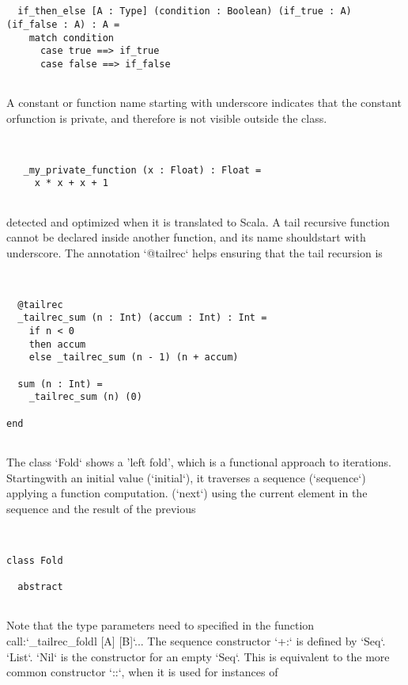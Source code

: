 \documentclass[12pt,a4paper]{article}
\begin{document}
\begin{lstlisting}


  if_then_else [A : Type] (condition : Boolean) (if_true : A) (if_false : A) : A =
    match condition
      case true ==> if_true
      case false ==> if_false


\end{lstlisting}

A constant or function name starting with underscore indicates that the constant orfunction is private, and therefore is not visible outside the class. 


\begin{lstlisting}


   _my_private_function (x : Float) : Float =
     x * x + x + 1


\end{lstlisting}

detected and optimized when it is translated to Scala. A tail recursive function cannot be declared inside another function, and its name shouldstart with underscore. The annotation `@tailrec` helps ensuring that the tail recursion is


\begin{lstlisting}


  @tailrec
  _tailrec_sum (n : Int) (accum : Int) : Int =
    if n < 0
    then accum
    else _tailrec_sum (n - 1) (n + accum)

  sum (n : Int) =
    _tailrec_sum (n) (0)

end


\end{lstlisting}

The class `Fold` shows a 'left fold', which is a functional approach to iterations. Startingwith an initial value (`initial`), it traverses a sequence (`sequence`) applying a function
computation. (`next`) using the current element in the sequence and the result of the previous


\begin{lstlisting}


class Fold

  abstract


\end{lstlisting}

Note that the type parameters need to specified in the function call:`_tailrec_foldl [A] [B]`... The sequence constructor `+:` is defined by `Seq`.
`List`. `Nil` is the constructor for an empty `Seq`. This is equivalent to the more common constructor `::`, when it is used for instances of
\end{document}
